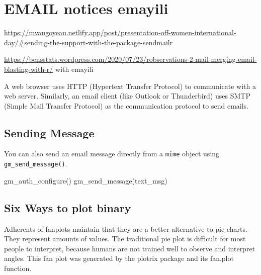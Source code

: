 \documentclass[
]{article}
\begin{document}
\hypertarget{email-notices-emayili}{%
\section{EMAIL notices emayili}\label{email-notices-emayili}}

\url{https://mvaugoyeau.netlify.app/post/presentation-off-women-international-day/\#sending-the-support-with-the-package-sendmailr}

\url{https://bensstats.wordpress.com/2020/07/23/robservations-2-mail-merging-email-blasting-with-r/}
with emayili

A web browser uses HTTP (Hypertext Transfer Protocol) to communicate
with a web server. Similarly, an email client (like Outlook or
Thunderbird) uses SMTP (Simple Mail Transfer Protocol) as the
communication protocol to send emails.

\hypertarget{sending-message}{%
\subsection{Sending Message}\label{sending-message}}

You can also send an email message directly from a \texttt{mime} object
using \texttt{gm\_send\_message()}.

gm\_auth\_configure() gm\_send\_message(text\_msg)

\hypertarget{six-ways-to-plot-binary}{%
\subsection{Six Ways to plot binary}\label{six-ways-to-plot-binary}}

Adherents of fanplots maintain that they are a better alternative to pie
charts. They represent amounts of values. The traditional pie plot is
difficult for most people to interpret, because humans are not trained
well to observe and interpret angles. This fan plot was generated by the
plotrix package and its fan.plot function.
\end{document}
